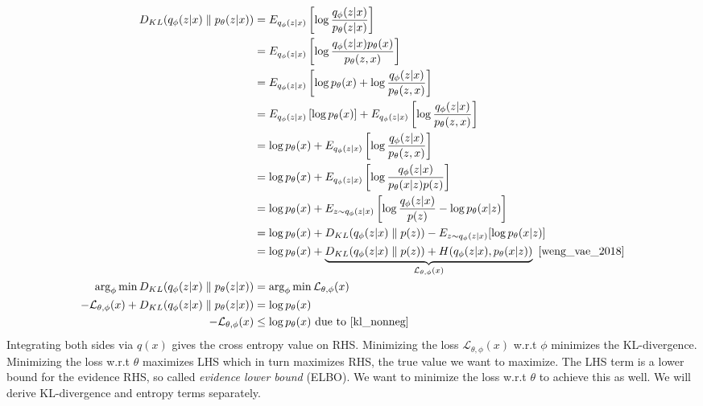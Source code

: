 \documentclass{book}
\numberwithin{equation}{subsection}
\begin{document}
\begin{align}
D_{KL}(q_\phi(z|x) \parallel p_\theta(z|x))
&=E_{q_\phi(z|x)}\left[ \log\frac{q_\phi(z|x)}{p_\theta(z|x)}\right]\\
&=E_{q_\phi(z|x)}\left[ \log\frac{q_\phi(z|x)p_\theta(x)}{p_\theta(z,x)}\right]\\
&=E_{q_\phi(z|x)}\left[ \log p_\theta(x) + \log\frac{q_\phi(z|x)}{p_\theta(z,x)}\right]\\
&=E_{q_\phi(z|x)}\left[\log p_\theta(x)\right] + E_{q_\phi(z|x)}\left[\log\frac{q_\phi(z|x)}{p_\theta(z,x)}\right]\\
&=\log p_\theta(x) + E_{q_\phi(z|x)}\left[\log\frac{q_\phi(z|x)}{p_\theta(z,x)}\right]\\
&=\log p_\theta(x) + E_{q_\phi(z|x)}\left[\log\frac{q_\phi(z|x)}{p_\theta(x|z)p(z)}\right]\\
&=\log p_\theta(x) + E_{z\sim q_\phi(z|x)}\left[\log \frac{q_\phi(z|x)}{p(z)} - \log p_\theta(x| z)\right]\\
&=\log p_\theta(x) + D_{KL}(q_\phi(z|x) \parallel p(z)) - E_{z\sim q_\phi(z|x)}[\log p_\theta(x|z)]\\
&=\log p_\theta(x) + \underbrace{D_{KL}(q_\phi(z|x) \parallel p(z)) + H(q_\phi(z|x), p_\theta(x|z))}_{\mathcal{L}_{\theta, \phi}(x)}~\cite{weng_vae_2018}\\
\arg_\phi\min D_{KL}(q_\phi(z|x) \parallel p_\theta(z|x)) &= \arg_\phi\min \mathcal{L}_{\theta, \phi}(x)\\
-\mathcal{L}_{\theta, \phi}(x)+D_{KL}(q_\phi(z|x) \parallel p_\theta(z|x))
&= \log p_\theta(x)\\
-\mathcal{L}_{\theta, \phi}(x)
&\leq \log p_\theta(x)\ \text{due to~\ref{kl_nonneg}} \label{vae_elbo}
\end{align}
Integrating both sides via $q(x)$ gives the cross entropy value on RHS. Minimizing the loss $\mathcal{L}_{\theta, \phi}(x)$ w.r.t $\phi$ minimizes the KL-divergence. Minimizing the loss w.r.t $\theta$ maximizes LHS which in turn maximizes RHS, the true value we want to maximize. The LHS term is a lower bound for the evidence RHS, so called \textit{evidence lower bound} (ELBO). We want to minimize the loss w.r.t $\theta$ to achieve this as well. We will derive KL-divergence and entropy terms separately.
\end{document}
